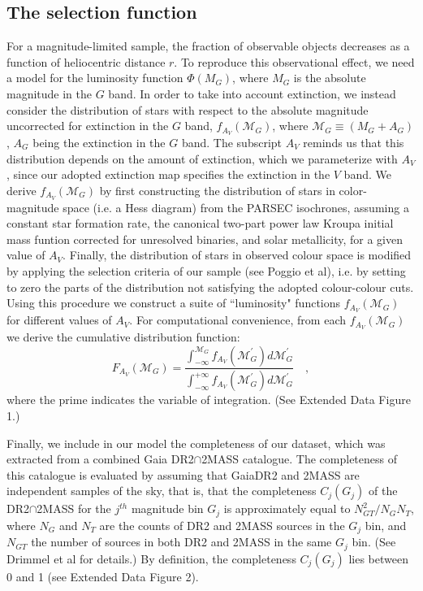 \documentclass{nature}
\begin{document}
\begin{methods}
\subsection{The selection function \label{selfun}}

For a magnitude-limited sample, the fraction of observable objects decreases as a function of heliocentric distance $r$. To reproduce this observational effect, we need a model for the luminosity function $\Phi(M_G)$, where $M_G$ is the absolute magnitude in the $G$ band. In order to take into account extinction, we instead consider the distribution of stars with respect to the absolute magnitude uncorrected for extinction in the $G$ band, $f_{A_V}(\mathcal{M}_G)$, where $\mathcal{M}_G \equiv (M_G + A_G)$, $A_G$ being the extinction in the $G$ band.  The subscript $A_V$ reminds us that this distribution depends on the amount of extinction, which we parameterize with $A_V$, since our adopted extinction map\cite{Drimmel:2003} specifies the extinction in the $V$ band. We derive $f_{A_V}(\mathcal{M}_G)$ by first constructing the distribution of stars in color-magnitude space (i.e. a Hess diagram) from the PARSEC isochrones\cite{Bressan:2012, Chen:2014,Chen:2015, Tang:2014}, assuming a constant star formation rate, the canonical two-part power law Kroupa initial mass funtion corrected for unresolved binaries\cite{Kroupa:2001, Kroupa:2002}, and solar metallicity, for a given value of $A_V$. Finally, the distribution of stars in observed colour space is modified by applying the selection criteria of our sample (see Poggio et al\cite{Poggio:2018}), i.e. by setting to zero the parts of the distribution not satisfying the adopted colour-colour cuts. Using this procedure we construct a suite of  ``luminosity" functions $f_{A_V}(\mathcal{M}_G)$ for different values of $A_V$. For computational convenience, from each $f_{A_V}(\mathcal{M}_G)$ we derive the cumulative distribution function: 
\begin{equation}
F_{A_V} (\mathcal{M}_G) = \frac{\int_{-\infty}^{\mathcal{M}_G} f_{A_V} (\mathcal{M}^\prime_G) d\mathcal{M}^\prime_G}
           {\int_{-\infty}^{+\infty} f_{A_V} (\mathcal{M}^\prime_G) d\mathcal{M}^\prime_G} \quad, 
\end{equation}
where the prime indicates the variable of integration. (See Extended Data Figure 1.)

Finally, we include in our model the completeness of our dataset, which was extracted from a combined Gaia DR2$\cap$2MASS catalogue\cite{Poggio:2018}. The completeness of this catalogue is evaluated by assuming that GaiaDR2 and 2MASS are independent samples of the sky, that is, that the completeness $C_j(G_j)$ of the DR2$\cap$2MASS for the $j^{th}$ magnitude bin $G_j$ is approximately equal to $N_{GT}^2/N_G N_T$, where $N_G$ and $N_T$ are the counts of DR2 and 2MASS sources in the $G_j$ bin, and $N_{GT}$ the number of sources in both DR2 and 2MASS in the same $G_j$ bin. (See Drimmel et al for details.) By definition, the completeness $C_j(G_j)$ lies between 0 and 1 (see Extended Data Figure 2). 


\end{methods}
\end{document}
